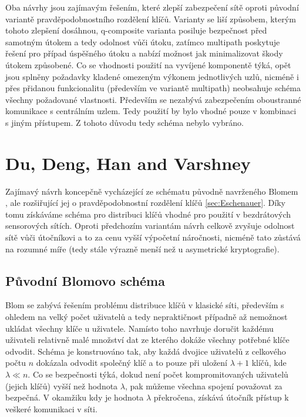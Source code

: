 \documentclass[11pt,final,twoside]{fithesis2}
\begin{document}
Oba návrhy jsou zajímavým řešením, které zlepší zabezpečení sítě oproti původní variantě pravděpodobnostního rozdělení klíčů. Varianty se liší způsobem, kterým tohoto zlepšení dosáhnou, q-composite 
varianta posiluje bezpečnost před samotným útokem a tedy odolnost vůči útoku, zatímco multipath poskytuje řešení pro případ úspěšného útoku a nabízí možnost jak minimalizovat škody útokem způsobené.
Co se vhodnosti použití na vyvíjené komponentě týká, opět jsou splněny požadavky kladené omezeným výkonem jednotlivých uzlů, nicméně i přes přidanou funkcionalitu (především ve 
variantě multipath) neobsahuje schéma všechny požadované vlastnosti. Především se nezabývá zabezpečením oboustranné komunikace s centrálním uzlem. Tedy použití by bylo vhodné pouze v kombinaci 
s jiným přístupem. Z tohoto důvodu tedy schéma nebylo vybráno. 


\section{Du, Deng, Han and Varshney}
Zajímavý návrh \cite{Du2005} koncepčně vycházející ze schématu původně navrženého Blomem \cite{Blom1985}, ale rozšiřující jej o pravděpodobnostní rozdělení klíčů \ref{sec:Eschenauer}.
Díky tomu získáváme schéma pro distribuci klíčů vhodné pro použití v bezdrátových sensorových sítích. Oproti předchozím variantám návrh celkově zvyšuje odolnost sítě vůči 
útočníkovi a to za cenu vyšší výpočetní náročnosti, nicméně tato zůstává na rozumné míře (tedy stále výrazně menší než u asymetrické kryptografie). 

\subsection{Původní Blomovo schéma}
Blom \cite{Blom1985} se zabývá řešením problému distribuce klíčů v klasické síti, především s ohledem na velký počet uživatelů a tedy nepraktičnost případně až nemožnost ukládat všechny klíče u uživatele.
Namísto toho navrhuje doručit každému uživateli relativně malé množství dat ze kterého dokáže všechny potřebné klíče odvodit. Schéma je konstruováno tak, aby každá dvojice uživatelů z celkového počtu $n$
dokázala odvodit společný klíč a to pouze při uložení $\lambda + 1$ klíčů, kde $\lambda \ll n$. Co se bezpečnosti týká, dokud není počet kompromitovaných uživatelů (jejich klíčů) vyšší než hodnota 
$\lambda$, pak můžeme všechna spojení považovat za bezpečná. V okamžiku kdy je hodnota $\lambda$ překročena, získává útočník přístup k veškeré komunikaci v síti. 
\end{document}

